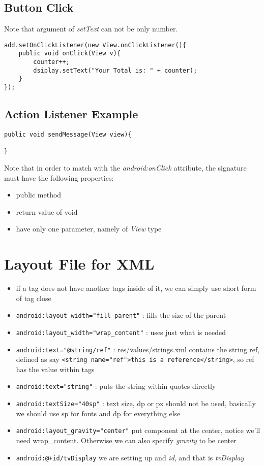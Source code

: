 \documentclass[a4paper, 12pt]{article}
\begin{document}
\subsection{Button Click}
Note that argument of \emph{setText} can not be only number.
\begin{verbatim}
add.setOnClickListener(new View.onClickListener(){
	public void onClick(View v){
		counter++;
		dsiplay.setText("Your Total is: " + counter);
	}
});
\end{verbatim}

\subsection{Action Listener Example}
\begin{verbatim}
public void sendMessage(View view){

}
\end{verbatim}
Note that in order to match with the \emph{android:onClick} attribute, the signature must have the following properties:
\begin{itemize}
	\item public method
	\item return value of void
	\item have only one parameter, namely of \emph{View} type
\end{itemize}

\section{Layout File for XML}
\begin{itemize}
	\item if a tag does not have another tags inside of it, we can simply use short form of tag close
	\item \verb|android:layout_width="fill_parent"|	: fills the size of the parent
	\item \verb|android:layout_width="wrap_content"| : uses just what is needed
	\item \verb|android:text="@string/ref"| : res/values/strings.xml contains the string ref, defined as say \verb|<string name="ref">this is a reference</string>|, so ref has the value within tags
	\item \verb|android:text="string"| : puts the string within quotes directly
	\item \verb|android:textSize="40sp"| : text size, dp or px should not be used, basically we should use sp for fonts and dp for everything else
	\item \verb|android:layout_gravity="center"| put component at the center, notice we'll need wrap\_content. Otherwise we can also specify \emph{gravity} to be center
	\item \verb|android:@+id/tvDisplay| we are setting up and \emph{id}, and that is \emph{tvDisplay}
\end{itemize}
\end{document}
